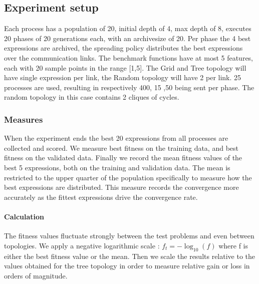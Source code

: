 \subsection{Experiment setup}
Each process has a population of 20, initial depth of 4, max depth of 8, executes 20 phases of 20 generations each, with an archivesize of 20. Per phase the 4 best expressions are archived, the spreading policy distributes the best expressions over the communication links. The benchmark functions have at most 5 features, each with 20 sample points in the range [1,5]. The Grid and Tree topology will have single expression per link, the Random topology will have 2 per link. 25 processes are used, resulting in respectively 400, 15 ,50 being sent per phase. The random topology in this case contains 2 cliques of cycles.


\subsubsection{Measures}
When the experiment ends the best 20 expressions from all processes are collected and scored. We measure best fitness on the training data, and best fitness on the validated data. 
Finally we record the mean fitness values of the best 5 expressions, both on the training and validation data. The mean is restricted to the upper quarter of the population specifically to measure how the best expressions are distributed. This measure records the convergence more accurately as the fittest expressions drive the convergence rate. 
\paragraph{Calculation}
The fitness values fluctuate strongly between the test problems and even between topologies. We apply a negative logarithmic scale :
$
f_t = -\log_{10}(f)
$
where f is either the best fitness value or the mean. Then we scale the results relative to the values obtained for the tree topology in order to measure relative gain or loss in orders of magnitude.
